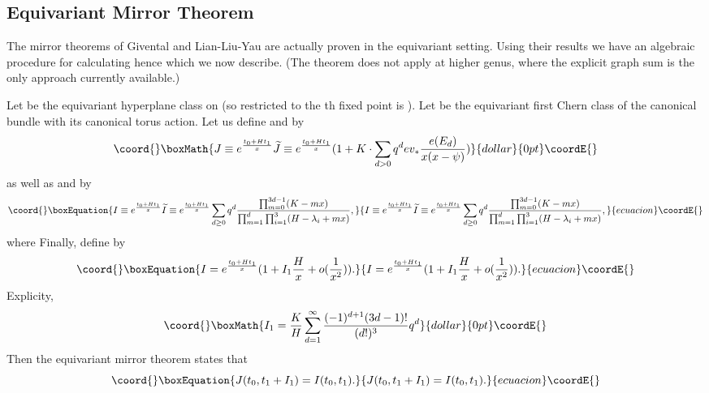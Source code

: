 \documentclass[a4paper,11pt]{article}
\providecommand{\PP}{{\mathbb{P}}}
\begin{document}
\subsection{Equivariant Mirror Theorem}

The mirror theorems of Givental \cite{G1} \cite{G2}
and Lian-Liu-Yau \cite{LLY} are actually proven in 
the equivariant setting.
Using their results we have an algebraic procedure
for calculating \coordHE{}
hence \coordHE{}
which we now describe.  (The theorem does not apply at
higher genus, where the explicit graph sum is the only
approach currently available.)

Let \coordHE{} be the equivariant hyperplane class on
\myHighlight{$\PP^2$}\coordHE{} (so \coordHE{} restricted to the \coordHE{}th fixed point
is \coordHE{}).  Let \coordHE{} be the equivariant first
Chern class of the canonical bundle with
its canonical torus action.  Let us define \coordHE{}
and \coordHE{} by
$$\coord{}\boxMath{
J\equiv e^{\frac{t_0 + H t_1}{x}} \widetilde{J}
\equiv e^{\frac{t_0 + H t_1}{x}}  (1 + K \cdot \sum_{d>0} q^d 
ev_*\frac{e(E_d)}{x(x-\psi)})
}{dollar}{0pt}\coordE{}$$
as well as \coordHE{} and \coordHE{} by
\begin{equation}\coord{}\boxEquation{
\label{Jeq}
I \equiv e^{\frac{t_0 + H t_1}{x}} \widetilde{I}
\equiv e^\frac{t_0 + H t_1}{x} 
\sum_{d\geq 0} q^d \frac{\prod_{m=0}^{3d-1}(K - mx)}
{\prod_{m=1}^{d} \prod_{i=1}^{3} (H-\lambda_i +mx)},
}{
I \equiv e^{\frac{t_0 + H t_1}{x}} \widetilde{I}
\equiv e^\frac{t_0 + H t_1}{x} 
\sum_{d\geq 0} q^d \frac{\prod_{m=0}^{3d-1}(K - mx)}
{\prod_{m=1}^{d} \prod_{i=1}^{3} (H-\lambda_i +mx)},
}{ecuacion}\coordE{}\end{equation}
where \coordHE{}
Finally, define \coordHE{} by
\begin{equation}\coord{}\boxEquation{
\label{Ieq}
I=  e^\frac{t_0 + H t_1}{x}(1+I_1 \frac{H}{x} + o(\frac{1}{x^2})).
}{
I=  e^\frac{t_0 + H t_1}{x}(1+I_1 \frac{H}{x} + o(\frac{1}{x^2})).
}{ecuacion}\coordE{}\end{equation}
Explicity, 
$$\coord{}\boxMath{
I_1=\frac{K}{H} \sum_{d=1}^\infty \frac{(-1)^{d+1}(3d-1)!}{(d!)^3}q^d
}{dollar}{0pt}\coordE{}$$
Then the equivariant mirror theorem states that
\begin{equation}\coord{}\boxEquation{
\label{equivmirthm}
J(t_0, t_1 + I_1) = I(t_0,t_1).
}{
J(t_0, t_1 + I_1) = I(t_0,t_1).
}{ecuacion}\coordE{}\end{equation}
\end{document}
